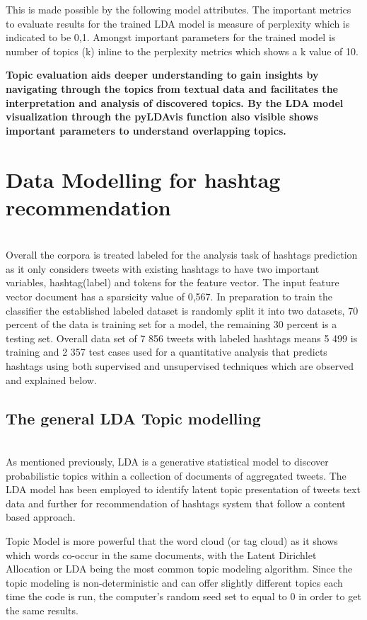 This is made possible by the following model attributes.
The important metrics to evaluate results for the trained LDA model is measure of perplexity which is indicated to be 0,1.  Amongst important parameters for the trained model is number of topics (k) inline to the perplexity metrics which shows a k value of 10.  

\textbf{Topic evaluation aids deeper understanding to gain insights by navigating through the topics from textual data and facilitates the interpretation and analysis of discovered topics.  By the LDA model visualization through the pyLDAvis function also visible shows important parameters to understand overlapping topics.}

\section{Data Modelling for hashtag recommendation}\\

Overall the corpora is treated labeled for the analysis task of hashtags prediction as it only considers tweets with existing hashtags to have two important variables, hashtag(label) and tokens for the feature vector.  The input feature vector document has a sparsicity value of 0,567.  In preparation to train the classifier the established labeled dataset is randomly split it into two datasets, 70 percent of the data is training set for a model, the remaining 30 percent is a testing set.  Overall data set of 7 856 tweets with labeled hashtags means 5 499 is training and 2 357 test cases used for a quantitative analysis that predicts hashtags using both supervised and unsupervised techniques which are observed and explained below.

\subsection{The general LDA Topic modelling}\\

As mentioned previously, LDA is a generative statistical model to discover probabilistic topics within a collection of documents of aggregated tweets. The LDA model has been employed to identify latent topic presentation of tweets text data and further for recommendation of hashtags system that follow a content based approach.

Topic Model is more powerful that the word cloud (or tag cloud) as it shows which words co-occur in the same documents, with the Latent Dirichlet Allocation or LDA being the most common topic modeling algorithm.  Since the topic modeling is non-deterministic and can offer slightly different topics each time the code is run, the computer's random seed set to equal to 0 in order to get the same results. 

